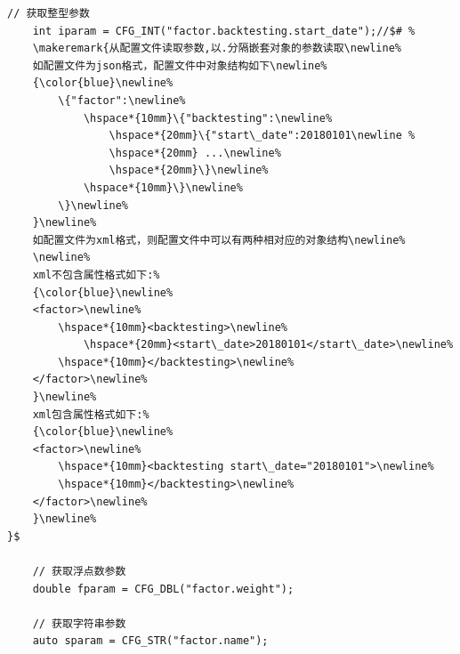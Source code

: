 \begin{lstlisting}[caption=高层API接口-获取基本参数类型,morekeywords={CFG_INT,CFG_DBL,CFG_STR}]
    // 获取整型参数
    int iparam = CFG_INT("factor.backtesting.start_date");//$# %
    \makeremark{从配置文件读取参数,以.分隔嵌套对象的参数读取\newline%
    如配置文件为json格式，配置文件中对象结构如下\newline%
    {\color{blue}\newline%
        \{"factor":\newline%
            \hspace*{10mm}\{"backtesting":\newline%
                \hspace*{20mm}\{"start\_date":20180101\newline %
                \hspace*{20mm} ...\newline%
                \hspace*{20mm}\}\newline%
            \hspace*{10mm}\}\newline%
        \}\newline%
    }\newline%
    如配置文件为xml格式，则配置文件中可以有两种相对应的对象结构\newline%
    \newline%
    xml不包含属性格式如下:%
    {\color{blue}\newline%
    <factor>\newline%
        \hspace*{10mm}<backtesting>\newline%
            \hspace*{20mm}<start\_date>20180101</start\_date>\newline%
        \hspace*{10mm}</backtesting>\newline%
    </factor>\newline%
    }\newline%
    xml包含属性格式如下:%
    {\color{blue}\newline%
    <factor>\newline%
        \hspace*{10mm}<backtesting start\_date="20180101">\newline%
        \hspace*{10mm}</backtesting>\newline%
    </factor>\newline%
    }\newline%
}$

    // 获取浮点数参数
    double fparam = CFG_DBL("factor.weight");

    // 获取字符串参数
    auto sparam = CFG_STR("factor.name");



\end{lstlisting}
\showremarks\hspace*{0mm}


